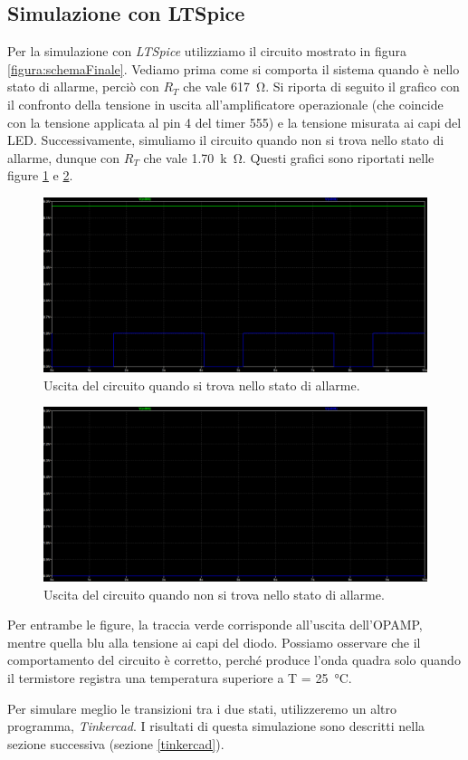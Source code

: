 \documentclass{report}
\begin{document}
\subsection{Simulazione con LTSpice}
Per la simulazione con \textit{LTSpice} utilizziamo il circuito mostrato in figura \ref{figura:schemaFinale}. Vediamo prima come si comporta il sistema quando è nello stato di allarme, perciò con $R_T$ che vale \SI{617}{\ohm}. Si riporta di seguito il grafico con il confronto della tensione in uscita all'amplificatore operazionale (che coincide con la tensione applicata al pin 4 del timer 555) e la tensione misurata ai capi del LED. Successivamente, simuliamo il circuito quando non si trova nello stato di allarme, dunque con $R_T$ che vale \SI{1.70}{k\ohm}. Questi grafici sono riportati nelle figure \ref{figura:sistemaON} e \ref{figura:sistemaOFF}. \par
\begin{figure}[h!]
	\centering
	\includegraphics[width=\textwidth]{immagini/sistemaON}
	\caption{Uscita del circuito quando si trova nello stato di allarme.} 
	\label{figura:sistemaON}
\end{figure}
\begin{figure}[h!]
	\centering
	\includegraphics[width=\textwidth]{immagini/sistemaOFF}
	\caption{Uscita del circuito quando non si trova nello stato di allarme.} 
	\label{figura:sistemaOFF}
\end{figure}
Per entrambe le figure, la traccia verde corrisponde all'uscita dell'OPAMP, mentre quella blu alla tensione ai capi del diodo. Possiamo osservare che il comportamento del circuito è corretto, perché produce l'onda quadra solo quando il termistore registra una temperatura superiore a T = \SI{25}{\celsius}. \par
Per simulare meglio le transizioni tra i due stati, utilizzeremo un altro programma, \textit{Tinkercad}. I risultati di questa simulazione sono descritti nella sezione successiva (sezione \ref{tinkercad}). 
\end{document}
